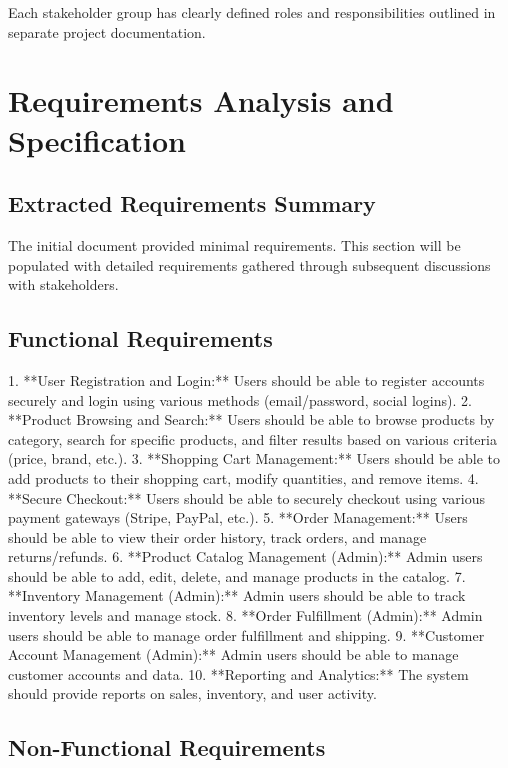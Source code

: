 \documentclass[11pt,a4paper,oneside]{article}
\begin{document}
Each stakeholder group has clearly defined roles and responsibilities outlined in separate project documentation.

\section{Requirements Analysis and Specification}

\subsection{Extracted Requirements Summary}

The initial document provided minimal requirements.  This section will be populated with detailed requirements gathered through subsequent discussions with stakeholders.

\subsection{Functional Requirements}

1. **User Registration and Login:** Users should be able to register accounts securely and login using various methods (email/password, social logins).
2. **Product Browsing and Search:**  Users should be able to browse products by category, search for specific products, and filter results based on various criteria (price, brand, etc.).
3. **Shopping Cart Management:**  Users should be able to add products to their shopping cart, modify quantities, and remove items.
4. **Secure Checkout:**  Users should be able to securely checkout using various payment gateways (Stripe, PayPal, etc.).
5. **Order Management:** Users should be able to view their order history, track orders, and manage returns/refunds.
6. **Product Catalog Management (Admin):** Admin users should be able to add, edit, delete, and manage products in the catalog.
7. **Inventory Management (Admin):** Admin users should be able to track inventory levels and manage stock.
8. **Order Fulfillment (Admin):** Admin users should be able to manage order fulfillment and shipping.
9. **Customer Account Management (Admin):** Admin users should be able to manage customer accounts and data.
10. **Reporting and Analytics:**  The system should provide reports on sales, inventory, and user activity.

\subsection{Non-Functional Requirements}
\end{document}
